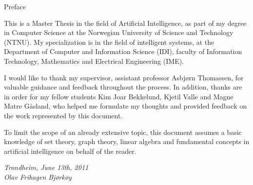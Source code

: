 \null\vspace{8em}
{
  \centering
  \normalfont
  \huge
  Preface\\
}
\vspace{2em}

\noindent
This is a Master Thesis in the field of Artificial Intelligence,
as part of my degree in Computer Science
at the Norwegian University of Science and Technology (NTNU).
My specialization is in the field of intelligent systems, 
at the Department of Computer and Information Science (IDI), 
faculty of Information Technology, Mathematics and Electrical Engineering (IME).

I would like to thank my supervisor, assistant professor Asbjørn Thomassen, for valuable guidance and feedback throughout the process.
In addition, thanks are in order for my fellow students 
Kim Joar Bekkelund, Kjetil Valle and Magne Matre Gåsland,
who helped me formulate my thoughts and provided feedback on the work represented by this document.

To limit the scope of an already extensive topic, 
this document assumes a basic knowledge of set theory, 
graph theory, linear algebra and fundamental concepts in artificial intelligence 
on behalf of the reader.

\vspace{1em}
\begin{flushleft}
  \color{red}
  \itshape
  \hspace{2.5em}Trondheim, June 13th, 2011\\
  \hspace{2.5em}Olav Frihagen Bjørkøy\\
\end{flushleft}

\cleardoublepage
